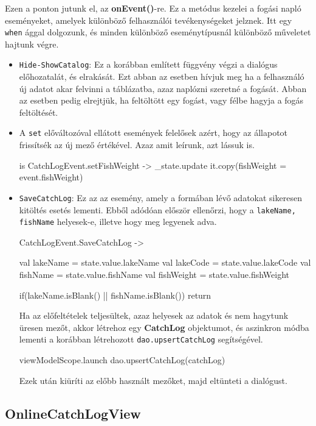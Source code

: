 Ezen a ponton jutunk el, az \textbf{onEvent()}-re. Ez a metódus kezelei a fogási napló eseményeket, amelyek különböző felhasználói tevékenységeket jelznek. Itt egy \texttt{when} ággal dolgozunk, és minden különböző eseménytípusnál különböző műveletet hajtunk végre.
\begin{itemize}
    \item \texttt{Hide-ShowCatalog}: Ez a korábban említett függvény végzi a dialógus előhozatalát, és elrakását. Ezt abban az esetben hívjuk meg ha a felhasználó új adatot akar felvinni a táblázatba, azaz naplózni szeretné a fogását. Abban az esetben pedig elrejtjük, ha feltöltött egy fogást, vagy félbe hagyja a fogás feltöltését.
    \item A \texttt{set} előváltozóval ellátott események felelősek azért, hogy az állapotot frissítsék az új mező értékével. Azaz amit leírunk, azt lássuk is.
\begin{java}
is CatchLogEvent.setFishWeight -> {
    _state.update { 
        it.copy(fishWeight = event.fishWeight) }
}
\end{java}

    \item \texttt{SaveCatchLog}: Ez az az esemény, amely a formában lévő adatokat sikeresen kitöltés esetés lementi. Ebből adódóan először ellenőrzi, hogy a \texttt{lakeName, fishName} helyesek-e, illetve hogy meg legyenek adva.
\begin{java}
CatchLogEvent.SaveCatchLog -> {
            val lakeName = state.value.lakeName
            val lakeCode = state.value.lakeCode
            val fishName = state.value.fishName
            val fishWeight = state.value.fishWeight

            if(lakeName.isBlank() || fishName.isBlank()) {
                return
            }
        }
\end{java}

    Ha az előfeltételek teljesültek, azaz helyesek az adatok és nem hagytunk üresen mezőt, akkor létrehoz egy \textbf{CatchLog} objektumot, és aszinkron módba lementi a korábban létrehozott \texttt{dao.upsertCatchLog} segítségével.
\begin{java}
viewModelScope.launch {
        dao.upsertCatchLog(catchLog)
        }
\end{java}
    Ezek után kiüríti az előbb használt mezőket, majd eltünteti a dialógust.
\end{itemize}

\subsection{OnlineCatchLogView}

